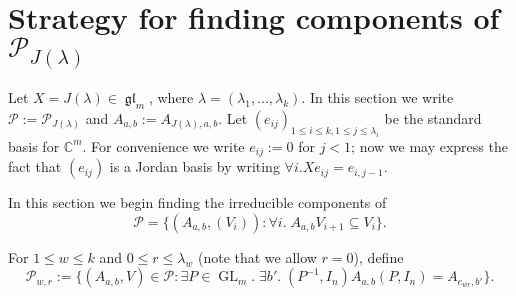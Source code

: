 \documentclass[12pt,psamsfonts]{article}
\DeclareMathOperator{\GL}{GL}
\DeclareMathOperator{\gl}{\mathfrak{gl}}
\begin{document}
\section{Strategy for finding components of \texorpdfstring{\(\mathcal{P}_{J(\lambda)}\)}{P\_\{J(\textbackslash lambda)\}}}\label{p_comp_strat}
\par Let \(X = J(\lambda) \in \gl_m\), where \(\lambda = (\lambda_1, ..., \lambda_k)\).
In this section we write \(\mathcal{P} := \mathcal{P}_{J(\lambda)}\) and \(A_{a, b} := A_{J(\lambda), a, b}\).
Let \((e_{ij})_{1 \leq i \leq k, 1 \leq j \leq \lambda_i}\) be the standard basis for \(\mathbb{C}^m\).
For convenience we write \(e_{ij} := 0\) for \(j < 1\); now we may express the fact that \((e_{ij})\) is a Jordan basis by writing \(\forall i. Xe_{ij} = e_{i,j - 1}\).
\par In this section we begin finding the irreducible components of
\[\mathcal{P} = \{(A_{a, b}, (V_i)) : \forall i. \; A_{a, b} V_{i + 1} \subseteq V_i\}.\]
\par For \(1 \leq w \leq k\) and \(0 \leq r \leq \lambda_w\) (note that we allow \(r = 0\)), define 
\[\mathcal{P}_{w,r} := \{(A_{a, b}, V) \in \mathcal{P} : \exists P \in \GL_{m}. \; \exists b'. \; (P^{-1}, I_n) A_{a, b} (P, I_n) = A_{e_{wr}, b'} \}.\]
\end{document}

